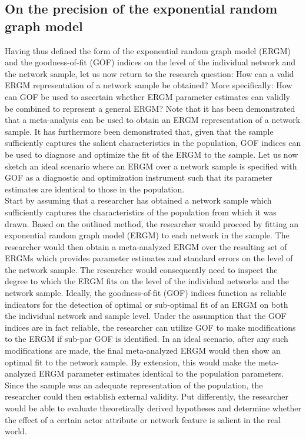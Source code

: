 \documentclass[a4paper, man, floatsintext]{apa6}
\begin{document}
\subsection{On the precision of the exponential random graph model}
Having thus defined the form of the exponential random graph model (ERGM) and the goodness-of-fit (GOF) indices on the level of the individual network and the network sample, let us now return to the research question: How can a valid ERGM representation of a network sample be obtained? More specifically: How can GOF be used to ascertain whether ERGM parameter estimates can validly be combined to represent a general ERGM? Note that it has been demonstrated that a meta-analysis can be used to obtain an ERGM representation of a network sample. It has furthermore been demonstrated that, given that the sample sufficiently captures the salient characteristics in the population, GOF indices can be used to diagnose and optimize the fit of the ERGM to the sample. Let us now sketch an ideal scenario where an ERGM over a network sample is specified with GOF as a diagnostic and optimization instrument such that its parameter estimates are identical to those in the population.
\\
Start by assuming that a researcher has obtained a network sample which sufficiently captures the characteristics of the population from which it was drawn. Based on the outlined method, the researcher would proceed by fitting an exponential random graph model (ERGM) to each network in the sample. The researcher would then obtain a meta-analyzed ERGM over the resulting set of ERGMs which provides parameter estimates and standard errors on the level of the network sample. The researcher would consequently need to inspect the degree to which the ERGM fits on the level of the individual networks and the network sample. Ideally, the goodness-of-fit (GOF) indices function as reliable indicators for the detection of optimal or sub-optimal fit of an ERGM on both the individual network and sample level. Under the assumption that the GOF indices are in fact reliable, the researcher can utilize GOF to make modifications to the ERGM if sub-par GOF is identified. In an ideal scenario, after any such modifications are made, the final meta-analyzed ERGM would then show an optimal fit to the network sample. By extension, this would make the meta-analyzed ERGM parameter estimates identical to the population parameters. \clearpage \noindent Since the sample was an adequate representation of the population, the researcher could then establish external validity. Put differently, the researcher would be able to evaluate theoretically derived hypotheses and determine whether the effect of a certain actor attribute or network feature is salient in the real world. 
\end{document}
